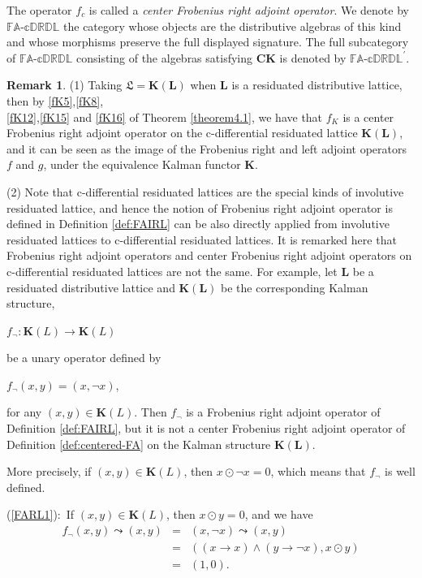 \documentclass[final,12pt,times]{elsarticle}
\theoremstyle{plain}
\theoremstyle{definition}
\newtheorem{remark}[definition]{Remark}
\theoremstyle{break}
\newcommand{\CFAD}{\mathbb{FA\text{-}cDRDL}}
\newcommand{\CFADp}{\mathbb{FA\text{-}cDRDL}^{\prime}}
\begin{document}
The operator $f_c$ is called a \emph{center Frobenius right adjoint operator}.
We denote by $\CFAD$ the category whose objects are the distributive algebras
of this kind and whose morphisms preserve the full displayed signature.  The
full subcategory of $\CFAD$ consisting of the algebras satisfying $\mathbf{CK}$
is denoted by $\CFADp$.

\begin{remark}\label{rem:definition-explan.} (1) Taking $\boldsymbol{\mathfrak{L}}=\mathbf{K(L)}$ when $\mathbf{L}$ is a residuated distributive lattice, then by \ref{fK5},\ref{fK8},\\\ref{fK12},\ref{fK15} and \ref{fK16} of Theorem \ref{theorem4.1}, we have that $f_K$ is a center Frobenius right adjoint operator on the c-differential residuated lattice $\mathbf{K(L)}$, and it can be seen as the image of the Frobenius right and left adjoint operators $f$ and $g$, under the equivalence Kalman functor $\mathbf{K}$. 

(2) Note that c-differential residuated lattices are the special kinds of involutive residuated lattice, and hence the notion of Frobenius right adjoint operator is defined in Definition \ref{def:FAIRL}  can be also directly applied from involutive residuated lattices to c-differential residuated lattices. It is remarked here that Frobenius right adjoint operators and center Frobenius right adjoint operators on c-differential residuated lattices are not the same. For example, let $\mathbf{L}$ be a residuated distributive lattice and $\mathbf{K(L)}$ be the corresponding Kalman structure, 
\begin{center}$f_{\neg}:\mathbf{K}(L)\rightarrow \mathbf{K}(L)$ 
\end{center} be a unary operator defined by 
\begin{center} $f_{\neg}(x,y)=(x,\neg x)$,
\end{center} for any $(x,y)\in \mathbf{K}(L)$. Then $f_{\neg}$ is a Frobenius right adjoint operator of Definition \ref{def:FAIRL}, but it is not a center Frobenius right adjoint operator of Definition \ref{def:centered-FA} on the Kalman structure $\mathbf{K(L)}$.

 More precisely, if $(x,y)\in \mathbf{K}(L)$, then $x\odot \neg x=0$, which means that $f_{\neg}$ is well defined.

(\ref{FARL1}):\ If $(x,y)\in \mathbf{K}(L)$, then $ x\odot y=0$, and we have
\begin{eqnarray*}
               f_{\neg}(x,y)\leadsto (x,y)&=& (x,{\neg}x)\leadsto (x,y)\\&=&((x\rightarrow x)\wedge(y\rightarrow \neg x),x\odot y)\\&=&(1,0).
               \end{eqnarray*}


\end{remark}
\end{document}
